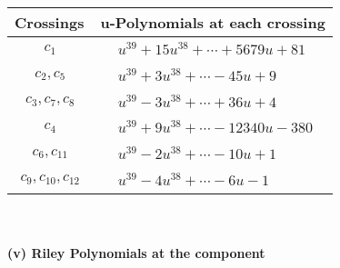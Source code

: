 \documentclass[1p]{elsarticle_modified}
\theoremstyle{definition}
\begin{document}
\begin{tabular}{m{50pt}|m{274pt}}
Crossings & \hspace{64pt}u-Polynomials at each crossing \\
\hline $$\begin{aligned}c_{1}\end{aligned}$$&$\begin{aligned}
&u^{39}+15 u^{38}+\cdots+5679 u+81
\end{aligned}$\\
\hline $$\begin{aligned}c_{2},c_{5}\end{aligned}$$&$\begin{aligned}
&u^{39}+3 u^{38}+\cdots-45 u+9
\end{aligned}$\\
\hline $$\begin{aligned}c_{3},c_{7},c_{8}\end{aligned}$$&$\begin{aligned}
&u^{39}-3 u^{38}+\cdots+36 u+4
\end{aligned}$\\
\hline $$\begin{aligned}c_{4}\end{aligned}$$&$\begin{aligned}
&u^{39}+9 u^{38}+\cdots-12340 u-380
\end{aligned}$\\
\hline $$\begin{aligned}c_{6},c_{11}\end{aligned}$$&$\begin{aligned}
&u^{39}-2 u^{38}+\cdots-10 u+1
\end{aligned}$\\
\hline $$\begin{aligned}c_{9},c_{10},c_{12}\end{aligned}$$&$\begin{aligned}
&u^{39}-4 u^{38}+\cdots-6 u-1
\end{aligned}$\\
\hline
\end{tabular}\\~\\
\newpage\renewcommand{\arraystretch}{1}
\flushleft \textbf{(v) Riley Polynomials at the component}\newline \\
\end{document}
